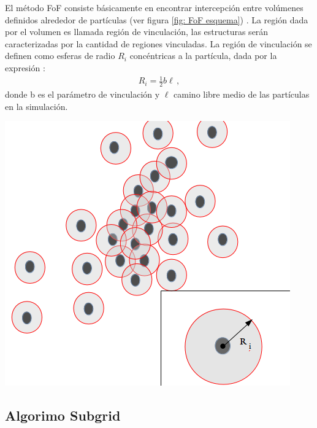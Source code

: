 El método FoF consiste básicamente en encontrar intercepción entre volúmenes definidos alrededor de partículas (ver figura  \ref{fig: FoF esquema}) . La región dada por el volumen es llamada región de vinculación, las estructuras serán caracterizadas por la cantidad de regiones vinculadas. La región de vinculación se definen como esferas de radio $R_{i}$ concéntricas a la partícula, dada por la expresión \cite{bustamente01}:
%
\begin{align}
    R_{i}=\frac{1}{2}b\ell\,,
\end{align}
%
donde b es el parámetro de vinculación y $\ell$ camino libre medio de las partículas en la simulación. 
%
\begin{center}
\includegraphics[scale=.35]{./figures/5_Algoritmo_Modelacion/FoF_metodo.png}
\label{fig: FoF esquema}
\end{center}
%

    \subsection{Algorimo Subgrid}
    \label{subsec: Algoritmo subgrid}

